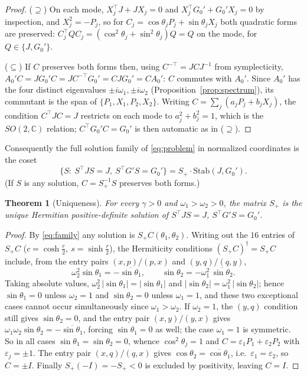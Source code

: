 \documentclass[11pt]{article}
\newtheorem{theorem}{Theorem}[section]
\theoremstyle{definition}
\theoremstyle{remark}
\newcommand{\C}{\mathbb{C}}
\newcommand{\w}{\omega}
\newcommand{\Stab}{\mathrm{Stab}}
\newcommand{\dg}{\dagger}
\begin{document}
\begin{proof}
($\supseteq$)\; On each mode, $X_j^{\top}J+JX_j=0$ and
$X_j^{\top}G_0'+G_0'X_j=0$ by inspection, and $X_j^2=-P_j$, so for
$C_j=\cos\theta_j P_j+\sin\theta_j X_j$ both quadratic forms are preserved:
$C_j^{\top}QC_j=(\cos^2\theta_j+\sin^2\theta_j)Q=Q$ on the mode, for
$Q\in\{J,G_0'\}$.

($\subseteq$)\; If $C$ preserves both forms then, using
$C^{-\top}=JCJ^{-1}$ from symplecticity,
$A_0'C=JG_0'C=JC^{-\top}G_0'=CJG_0'=CA_0'$: $C$ commutes with $A_0'$.  Since
$A_0'$ has the four distinct eigenvalues $\pm i\w_1,\pm i\w_2$
(Proposition~\ref{prop:spectrum}), its commutant is the span of
$\{P_1,X_1,P_2,X_2\}$.  Writing $C=\sum_j(a_jP_j+b_jX_j)$, the condition
$C^{\top}JC=J$ restricts on each mode to $a_j^2+b_j^2=1$, which is the
$SO(2,\C)$ relation; $C^{\top}G_0'C=G_0'$ is then automatic as in
($\supseteq$).
\end{proof}

Consequently the full solution family of \eqref{eq:problem} in normalized
coordinates is the coset
\begin{equation}\label{eq:family}
\{S:\ S^{\top}JS=J,\ S^{\top}G'S=G_0'\}
= S_+\cdot\Stab(J,G_0') .
\end{equation}
(If $S$ is any solution, $C=S_+^{-1}S$ preserves both forms.)

\begin{theorem}[Uniqueness]\label{thm:uniqueness}
For every $\gamma>0$ and $\w_1>\w_2>0$, the matrix $S_+$ is the unique
Hermitian positive-definite solution of
$S^{\top}JS=J$, $S^{\top}G'S=G_0'$.
\end{theorem}

\begin{proof}
By \eqref{eq:family} any solution is $S_+C(\theta_1,\theta_2)$.  Writing out
the $16$ entries of $S_+C$ ($c=\cosh\tfrac r2,\ s=\sinh\tfrac r2$), the
Hermiticity conditions $(S_+C)^{\dg}=S_+C$ include, from the entry pairs
$(x,p)/(p,x)$ and $(y,q)/(q,y)$,
\begin{equation}\label{eq:herm}
\w_2^2\sin\theta_1=-\overline{\sin\theta_1},
\qquad
\sin\theta_2=-\w_1^2\,\overline{\sin\theta_2} .
\end{equation}
Taking absolute values, $\w_2^2\,|\sin\theta_1|=|\sin\theta_1|$ and
$|\sin\theta_2|=\w_1^2\,|\sin\theta_2|$; hence $\sin\theta_1=0$ unless
$\w_2=1$ and $\sin\theta_2=0$ unless $\w_1=1$, and these two exceptional
cases cannot occur simultaneously since $\w_1>\w_2$.  If $\w_2=1$, the
$(y,q)$ condition still gives $\sin\theta_2=0$, and the entry pair
$(x,y)/(y,x)$ gives
$\w_1\w_2\sin\theta_2=-\overline{\sin\theta_1}$, forcing $\sin\theta_1=0$ as
well; the case $\w_1=1$ is symmetric.  So in all cases
$\sin\theta_1=\sin\theta_2=0$, whence $\cos^2\theta_j=1$ and
$C=\varepsilon_1P_1+\varepsilon_2P_2$ with $\varepsilon_j=\pm1$.  The entry
pair $(x,q)/(q,x)$ gives
$\cos\theta_2=\overline{\cos\theta_1}$, i.e.\
$\varepsilon_1=\varepsilon_2$, so $C=\pm I$.  Finally $S_+(-I)=-S_+<0$ is
excluded by positivity, leaving $C=I$.
\end{proof}
\end{document}
